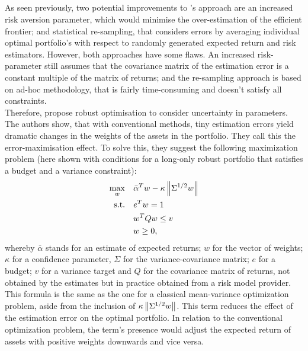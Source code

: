 \subsection{}
As seen previously, two potential improvements to \citeauthor{markowitz_1952}'s approach are an increased risk aversion parameter, which would minimise the over-estimation of the efficient frontier; and statistical re-sampling, that considers errors by averaging individual optimal portfolio's with respect to randomly generated expected return and risk estimators. However, both approaches have some flaws. An increased risk-parameter still assumes that the covariance matrix of the estimation error is a constant multiple of the matrix of returns; and the re-sampling approach is based on ad-hoc methodology, that is fairly time-consuming and doesn't satisfy all constraints.\\
Therefore, \cite{ceria_stubbs_2006} propose robust optimisation to consider uncertainty in parameters. The authors show, that with conventional methods, tiny estimation errors yield dramatic changes in the weights of the assets in the portfolio. They call this the error-maximisation effect. To solve this, they suggest the following maximization problem (here shown with conditions for a long-only robust portfolio that satisfies a budget and a variance constraint):
\begin{equation}
\begin{aligned}
\max_w \quad & \bar{\alpha}^Tw-\kappa\left\lVert\Sigma^{1/2}w\right\rVert\\
\textrm{s.t.} \quad & e^Tw=1\\
  & w^TQw \leq v\\
  & w \geq 0\textrm{,}\\
\end{aligned}
\end{equation}
whereby $\bar{\alpha}$ stands for an estimate of expected returns; $w$ for the vector of weights; $\kappa$ for a confidence parameter, $\Sigma$ for the variance-covariance matrix; $e$ for a budget; $v$ for a variance target and $Q$ for the covariance matrix of returns, not obtained by the estimates but in practice obtained from a risk model provider.\\
This formula is the same as the one for a classical mean-variance optimization problem, aside from the inclusion of $\kappa\left\lVert\Sigma^{1/2}w\right\rVert$. This term reduces the effect of the estimation error on the optimal portfolio. In relation to the conventional optimization problem, the term's presence would adjust the expected return of assets with positive weights downwards and vice versa.\\
